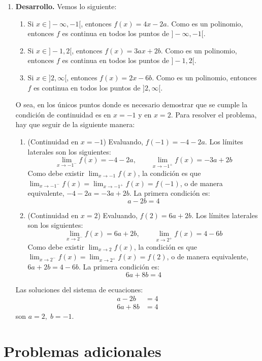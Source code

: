 \documentclass[10pt]{article}
\newcommand{\2}[1]{\hspace{-0.93cm}\colorbox{color1}{\hspace{0.07cm} \parbox{17cm}{\vspace{0.2cm} #1}\hspace*{0.07cm} }}
\newcommand{\3}[1]{\hspace{-0.93cm}\colorbox{color7}{\hspace{0.07cm} \parbox{17cm}{\vspace{0.2cm} #1}\hspace*{0.07cm} }}
\theoremstyle{theorem}
\numberwithin{equation}{section}
\newcommand{\dis}{\displaystyle}
\begin{document}
\begin{enumerate}[1.]
$$\begin{array}{ccc}
4x-2a,&si& x\leq -1\\ 3ax+2b  ,&si& -1\leq x\leq 2 \\2x-6b,&si& x> 2
\end{array}        \right.$$
  \item[] \textbf{Desarrollo.} Vemos lo siguiente:
  \begin{enumerate}[1.]
     \item Si $x\in ]-\infty,-1[$, entonces $f(x)=4x-2a$. Como es un polinomio, entonces $f$ es continua en todos los puntos de $]-\infty,-1[$.
     \item Si $x\in ]-1,2[$, entonces $f(x)=3ax+2b$. Como es un polinomio, entonces $f$ es continua en todos los puntos de $]-1,2[$.
     \item Si $x\in ]2,\infty[$, entonces $f(x)=2x-6b$. Como es un polinomio, entonces $f$ es continua en todos los puntos de $]2,\infty[$.
  \end{enumerate}
  O sea, en los \'unicos puntos donde es necesario demostrar que se cumple la condici\'on de continuidad es en $x=-1$ y en $x=2$. Para resolver el problema, hay que seguir de la siguiente manera:
  \begin{enumerate}[1.]
     \item (Continuidad en $x=-1$) Evaluando, $f(-1)=-4-2a$. Los l\'imites laterales son los siguientes: $$\lim_{x\to -1^{-}}f(x)=-4-2a,\qquad  \lim_{x\to -1^{+}}f(x)=-3a+2b$$ Como debe existir $\dis \lim_{x\to -1}f(x)$, la condici\'on es que $\dis \lim_{x\to -1^{-}}f(x)=\lim_{x\to -1^{+}}f(x)=f(-1)$, o de manera equivalente, $-4-2a=-3a+2b$. La primera condici\'on es: $$a-2b=4$$ 
     \item (Continuidad en $x=2$) Evaluando, $f(2)=6a+2b$. Los l\'imites laterales son los siguientes: $$\lim_{x\to 2^{-}}f(x)=6a+2b,\qquad  \lim_{x\to 2^{+}}f(x)=4-6b$$ Como debe existir $\dis \lim_{x\to 2}f(x)$, la condici\'on es que $\dis \lim_{x\to 2^{-}}f(x)=\lim_{x\to 2^{+}}f(x)=f(2)$, o de manera equivalente, $6a+2b=4-6b$. La primera condici\'on es: $$6a+8b=4$$ 
  \end{enumerate}
  Las soluciones del sistema de ecuaciones: 
  \begin{align*}
  a-2b&=4\\
  6a+8b&=4
  \end{align*} son $\dis a=2,\; b=-1$.
\end{enumerate}

\section{Problemas adicionales}
\end{document}
